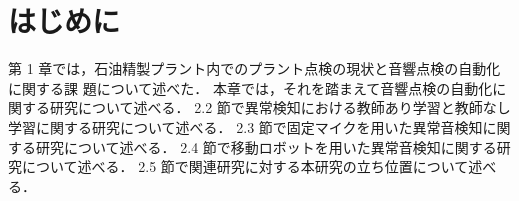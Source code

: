 \documentclass[../main]{subfiles}
\begin{document}
\section{はじめに}
第 1 章では，石油精製プラント内でのプラント点検の現状と音響点検の自動化に関する課
題について述べた．
本章では，それを踏まえて音響点検の自動化に関する研究について述べる．
2.2 節で異常検知における教師あり学習と教師なし学習に関する研究について述べる．
2.3 節で固定マイクを用いた異常音検知に関する研究について述べる．
2.4 節で移動ロボットを用いた異常音検知に関する研究について述べる．
2.5 節で関連研究に対する本研究の立ち位置について述べる．
\end{document}
